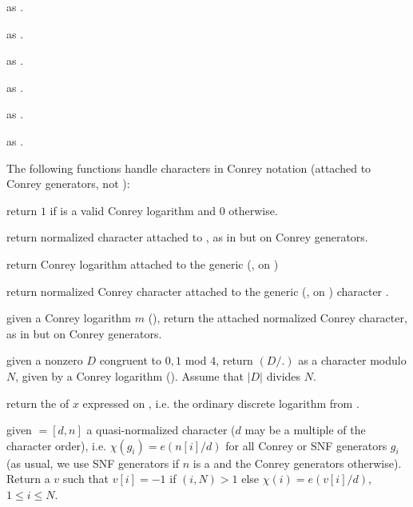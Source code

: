  as .

 as .

 as .

 as .

 as .

 as .

The following functions handle characters in Conrey notation (attached to
Conrey generators, not ):

 return $1$ if  is
a valid Conrey logarithm and $0$ otherwise.

 return normalized character
attached to , as in  but on Conrey generators.

 return Conrey logarithm
attached to the generic (, on )

 return normalized
Conrey character attached to the generic (, on )
character .

 given a Conrey logarithm $m$
(), return the attached normalized Conrey character, as in
 but on Conrey generators.

 given a nonzero  $D$ congruent
to $0,1$ mod $4$, return $(D/.)$ as a character modulo $N$, given by a Conrey
logarithm (). Assume that $|D|$ divides $N$.

 return the  of $x$
expressed on , i.e. the ordinary discrete logarithm
from .

given  $= [d,n]$ a quasi-normalized character ($d$
may be a multiple of the character order), i.e. $\chi(g_i) = e(n[i]/d)$
for all Conrey or SNF generators $g_i$ (as usual, we use SNF generators
if $n$ is a  and the Conrey generators otherwise).
Return a  $v$ such that $v[i] = -1$ if $(i,N) > 1$ else
$\chi(i) = e(v[i]/d)$, $1 \leq i \leq N$.

